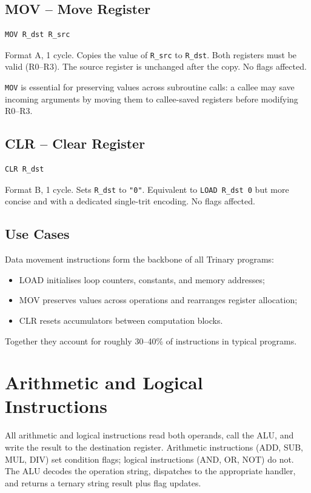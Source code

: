 \documentclass[10pt,a4paper,twoside]{book}
\begin{document}
\section{MOV -- Move Register}

\begin{verbatim}
MOV R_dst R_src
\end{verbatim}
Format A, 1 cycle. Copies the value of \texttt{R\_src} to \texttt{R\_dst}. Both
registers must be valid (R0--R3). The source register is unchanged after the copy.
No flags affected.

\texttt{MOV} is essential for preserving values across subroutine calls: a callee
may save incoming arguments by moving them to callee-saved registers before
modifying R0--R3.

\section{CLR -- Clear Register}

\begin{verbatim}
CLR R_dst
\end{verbatim}
Format B, 1 cycle. Sets \texttt{R\_dst} to \texttt{"0"}. Equivalent to
\texttt{LOAD R\_dst 0} but more concise and with a dedicated single-trit encoding.
No flags affected.

\section{Use Cases}

Data movement instructions form the backbone of all Trinary programs:
\begin{itemize}
    \item LOAD initialises loop counters, constants, and memory addresses;
    \item MOV preserves values across operations and rearranges register allocation;
    \item CLR resets accumulators between computation blocks.
\end{itemize}
Together they account for roughly 30--40\% of instructions in typical programs.

\chapter{Arithmetic and Logical Instructions}
\label{ch:arithlogic}

All arithmetic and logical instructions read both operands, call the ALU, and write
the result to the destination register. Arithmetic instructions (ADD, SUB, MUL, DIV)
set condition flags; logical instructions (AND, OR, NOT) do not. The ALU decodes the
operation string, dispatches to the appropriate handler, and returns a ternary string
result plus flag updates.
\end{document}
